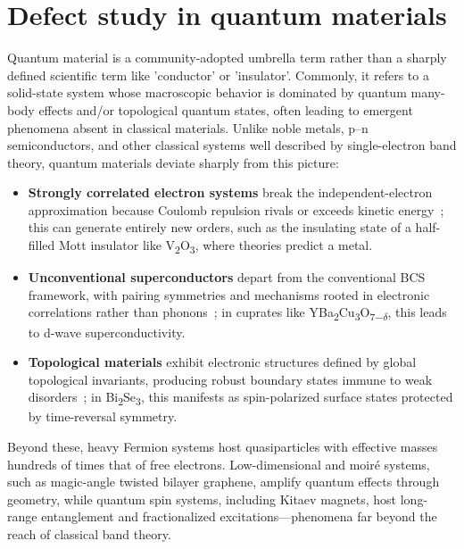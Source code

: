 \section{Defect study in quantum materials}
Quantum material is a community-adopted umbrella term rather than a sharply defined scientific term like 'conductor' or 'insulator'. Commonly, it refers to a solid-state system whose macroscopic behavior is dominated by quantum many-body effects and/or topological quantum states, often leading to emergent phenomena absent in classical materials. Unlike noble metals, p–n semiconductors, and other classical systems well described by single-electron band theory, quantum materials deviate sharply from this picture:
\begin{itemize}
	\item \textbf{Strongly correlated electron systems} break the independent-electron approximation because Coulomb repulsion rivals or exceeds kinetic energy~\cite{hubbardElectronCorrelationsNarrow1963}; this can generate entirely new orders, such as the insulating state of a half-filled Mott insulator like V\textsubscript{2}O\textsubscript{3}, where theories predict a metal\cite{mcwhanMottTransitionCrDoped1969}\cite{mottMetalInsulatorTransition1968}\cite{mottMetalInsulatorTransitions1990}.
	\item \textbf{Unconventional superconductors} depart from the conventional BCS framework, with pairing symmetries and mechanisms rooted in electronic correlations rather than phonons~\cite{OutShadowBCS2006}; in cuprates like 
	YBa\textsubscript{2}Cu\textsubscript{3}O\textsubscript{7$-\delta$}, this leads to d-wave superconductivity\cite{tsueiPairingSymmetryFlux1994}\cite{hardyPrecisionMeasurementsTemperature1993}\cite{kirtleySymmetryOrderParameter1995}.
	\item \textbf{Topological materials} exhibit electronic structures defined by global topological invariants, producing robust boundary states immune to weak disorders~\cite{chiuClassificationTopologicalQuantum2016}; in Bi\textsubscript{2}Se\textsubscript{3}, this manifests as spin-polarized surface states protected by time-reversal symmetry\cite{panElectronicStructureTopological2011}\cite{jozwiakSpinpolarizedSurfaceResonances2016}\cite{sobotaUltrafastElectronDynamics2014}.
\end{itemize}
Beyond these, heavy Fermion systems host quasiparticles with effective masses hundreds of times that of free electrons\cite{wirthExploringHeavyFermions2016}\cite{stewartHeavyfermionSystems1984}. Low-dimensional and moiré systems, such as magic-angle twisted bilayer graphene, amplify quantum effects through geometry\cite{caoUnconventionalSuperconductivityMagicangle2018}\cite{carrTwistronicsManipulatingElectronic2017}, while quantum spin systems, including Kitaev magnets, host long-range entanglement and fractionalized excitations\cite{normanHerbertsmithiteSearchQuantum2016}\cite{banejeeNeutronScatteringProximate2017}—phenomena far beyond the reach of classical band theory.  

